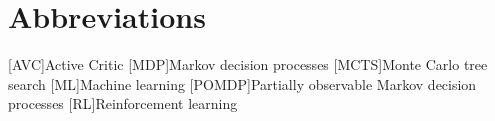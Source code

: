 
\chapter{Abbreviations}
\begin{acronym}
    [AVC]{Active Critic}
    [MDP]{Markov decision processes}
    [MCTS]{Monte Carlo tree search}
    [ML]{Machine learning}
    [POMDP]{Partially observable Markov decision processes}
    [RL]{Reinforcement learning}
\end{acronym}
